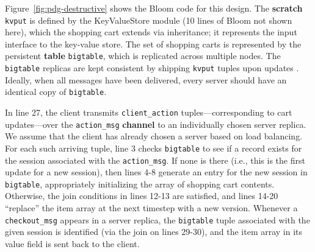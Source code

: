 Figure~\ref{fig:pdg-destructive} shows the Bloom code for this design.  The
\textbf{scratch} \texttt{kvput} is defined by the KeyValueStore module (10
lines of Bloom not shown here), which the shopping cart extends via
inheritance; it represents the input interface to the key-value store.
The set of shopping carts is represented by the persistent \textbf{table} \texttt{bigtable}, which is replicated across multiple nodes.  The \texttt{bigtable} replicas are kept 
consistent by shipping \texttt{kvput} tuples upon updates .
Ideally, when all messages have been delivered, every server should have an 
identical copy of \texttt{bigtable}.

In line 27, the client transmits \texttt{client\_action} tuples---corresponding to cart
updates---over the \texttt{action\_msg} \textbf{channel} to an individually
chosen server replica.  We assume that the client has already chosen a server
based on load balancing.
For each such arriving
tuple, line 3
checks \texttt{bigtable} to see if a record exists for the
session associated with the \texttt{action\_msg}.  If none is there (i.e., this
is the first update for a new session), then lines 4-8 generate an entry for
the new session in \texttt{bigtable}, appropriately initializing the array of
shopping cart contents.  Otherwise, the join conditions in lines 12-13 are
satisfied, and lines 14-20 ``replace'' the item array
at the next timestep with a new version.  
Whenever a \texttt{checkout\_msg} appears in a server replica, the 
\texttt{bigtable} tuple associated with the given session is identified (via the join
on lines 29-30), and the item array in its value field is sent back to the client.  


